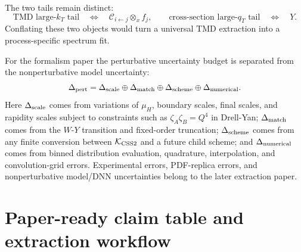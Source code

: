 \documentclass[11pt]{article}
\newcommand{\ox}{\otimes_x}
\newcommand{\KCSS}{\mathcal K_{\rm CSS2}}
\begin{document}
The two tails remain distinct:
\begin{equation}
  \boxed{\text{TMD large-}k_T\text{ tail}}
  \quad\Longleftrightarrow\quad
  \mathcal C_{i\leftarrow j}\ox f_j,
  \qquad
  \boxed{\text{cross-section large-}q_T\text{ tail}}
  \quad\Longleftrightarrow\quad
  Y.
  \label{eq:tail-distinction-final}
\end{equation}
Conflating these two objects would turn a universal TMD extraction into a process-specific
spectrum fit.

For the formalism paper the perturbative uncertainty budget is separated from the
nonperturbative model uncertainty:
\begin{equation}
  \Delta_{\rm pert}
  =
  \Delta_{\rm scale}
  \oplus
  \Delta_{\rm match}
  \oplus
  \Delta_{\rm scheme}
  \oplus
  \Delta_{\rm numerical}.
  \label{eq:pert-uncertainty-final}
\end{equation}
Here $\Delta_{\rm scale}$ comes from variations of $\mu_H$, boundary scales, final scales,
and rapidity scales subject to constraints such as $\zeta_A\zeta_B=Q^4$ in Drell-Yan;
$\Delta_{\rm match}$ comes from the $W$-$Y$ transition and fixed-order truncation;
$\Delta_{\rm scheme}$ comes from any finite conversion between $\KCSS$ and a future child
scheme; and $\Delta_{\rm numerical}$ comes from binned distribution evaluation,
quadrature, interpolation, and convolution-grid errors.  Experimental errors, PDF-replica
errors, and nonperturbative model/DNN uncertainties belong to the later extraction paper.

\section{Paper-ready claim table and extraction workflow}
\label{sec:paper-ready-claims-final}
\end{document}
